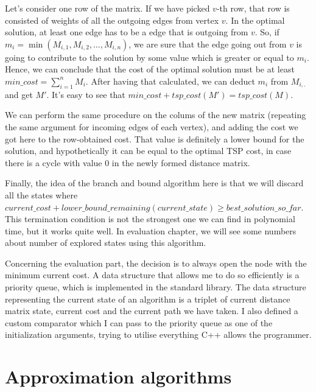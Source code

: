 \documentclass[12pt,twoside,notitlepage]{report}
\begin{document}
\smallskip

Let's consider one row of the matrix. If we have picked $v$-th row, that row is consisted of weights of all the outgoing edges from vertex $v$. In the optimal solution, at least one edge has to be a edge that is outgoing from $v$. So, if $m_{i} = \min(M_{i, 1}, M_{i, 2}, \dots, M_{i, n})$, we are sure that the edge going out from $v$ is going to contribute to the solution by some value which is greater or equal to $m_{i}$. Hence, we can conclude that the cost of the optimal solution must be at least $min\_cost = \sum_{i = 1}^{n} M_{i}$. After having that calculated, we can deduct $m_{i}$ from $M_{i, .}$ and get $M'$. It's easy to see that $min\_cost + tsp\_cost(M') = tsp\_cost(M)$. 

\smallskip

We can perform the same procedure on the colums of the new matrix (repeating the same argument for incoming edges of each vertex), and adding the cost we got here to the row-obtained cost. That value is definitely a lower bound for the solution, and hypothetically it can be equal to the optimal TSP cost, in case there is a cycle with value 0 in the newly formed distance matrix. 

\smallskip

Finally, the idea of the branch and bound algorithm here is that we will discard all the states where $current\_cost + lower\_bound\_remaining(current\_state) \geq best\_solution\_so\_far$. This termination condition is not the strongest one we can find in polynomial time, but it works quite well. In evaluation chapter, we will see some numbers about number of explored states using this algorithm.

\smallskip

Concerning the evaluation part, the decision is to always open the node with the minimum current cost. A data structure that allows me to do so efficiently is a priority queue, which is implemented in the standard library. The data structure representing the current state of an algorithm is a triplet of current distance matrix state, current cost and the current path we have taken. I also defined a custom comparator which I can pass to the priority queue as one of the initialization arguments, trying to utilise everything C++ allows the programmer.

\section{Approximation algorithms}
\end{document}
